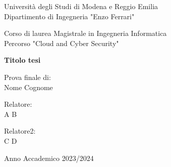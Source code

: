 \thispagestyle{plain}

\begin{titlepage}
    \begin{center}

		Università degli Studi di Modena e Reggio Emilia\\
		\large
		Dipartimento di Ingegneria "Enzo Ferrari"

        \vspace{2.5cm}
        
		\Large
		Corso di laurea Magistrale in Ingegneria Informatica\\
		
		\large
		Percorso "Cloud and Cyber Security"		
		
		\vspace{2.5cm}
        
        \Huge
        \textbf{Titolo tesi}

        \vspace{3cm}

		\large
		

		\begin{flushright}
		Prova finale di:\\
		Nome Cognome
		\end{flushright}		        
        
        
		\Large        
        \vspace{3cm}
        
        \begin{flushleft}
        Relatore:\\
        A B
        \end{flushleft}
                
        \begin{flushleft}
        Relatore2:\\
        C D
        \end{flushleft}
            
		\vfill
		
		\small
		Anno Accademico 2023/2024
            
    \end{center}
\end{titlepage}